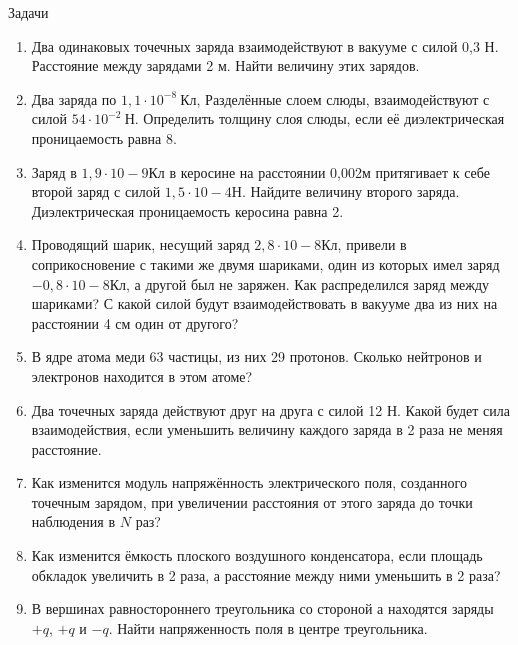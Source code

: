 \documentclass[a6paper, 11pt]{diss_4}
\renewcommand{\'}{\,'}
\begin{document}
\begin{center}
   Задачи
\end{center}
\begin{enumerate}
\item Два одинаковых точечных заряда взаимодействуют в вакууме с силой 0,3 Н. Расстояние между зарядами 2 м. Найти величину этих зарядов.
\item Два заряда по $1,1\cdot10^{-8}\ Кл$, Разделённые слоем слюды, взаимодействуют с силой $54\cdot10^{-2}\ Н$. Определить толщину слоя слюды, если её диэлектрическая проницаемость равна 8.
\item Заряд в $1,9\cdot10-9 Кл$ в керосине на расстоянии 0,002м притягивает к себе второй заряд с силой $1,5\cdot10-4 Н$. Найдите величину второго заряда. Диэлектрическая проницаемость керосина равна 2.
\item Проводящий шарик, несущий заряд $2,8\cdot10-8 Кл$, привели в соприкосновение с такими же двумя шариками, один из которых имел заряд $-0,8\cdot10-8 Кл$, а другой был не заряжен. Как распределился заряд между шариками? С какой силой будут взаимодействовать в вакууме два из них на расстоянии 4 см один от другого?
\item В ядре атома меди 63 частицы, из них 29 протонов. Сколько нейтронов и электронов находится в этом атоме?
\item Два точечных заряда действуют друг на друга с силой 12 Н. Какой будет сила взаимодействия, если уменьшить величину каждого заряда  в 2 раза не меняя расстояние.
\item Как изменится модуль напряжённость электрического поля, созданного точечным зарядом, при увеличении расстояния от этого заряда до точки наблюдения в $N$ раз?
\item Как изменится ёмкость плоского воздушного конденсатора, если площадь обкладок увеличить в 2 раза, а расстояние между ними уменьшить в 2 раза?
\item В вершинах равностороннего треугольника со стороной а находятся заряды $+q$, $+q$ и $-q$. Найти напряженность поля в центре треугольника.
\end{enumerate}
\end{document}
